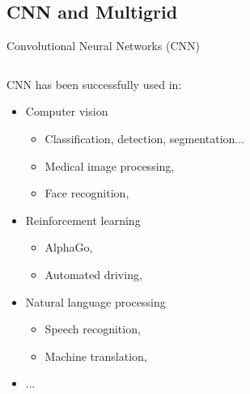 \documentclass{beamer}
\begin{document}
\begin{CJK*}{UTF8}{gbsn}
\section{CNN  and Multigrid}
\begin{frame}{Convolutional Neural Networks (CNN)}
\begin{columns}
\begin{column}{0.6\textwidth}
CNN has been successfully used in:
\begin{itemize}
\item Computer vision
\begin{itemize}
\item Classification, detection, segmentation...
\item Medical image processing,
\item Face recognition,
\end{itemize}
\item Reinforcement learning
\begin{itemize}
\item AlphaGo,
\item Automated driving,
\end{itemize}
\item Natural language processing
\begin{itemize}
\item Speech recognition,
\item  Machine translation,
\end{itemize}
\item ...
\end{itemize}
\end{column}


\end{columns}
\end{frame}
\end{CJK*}
\end{document}
